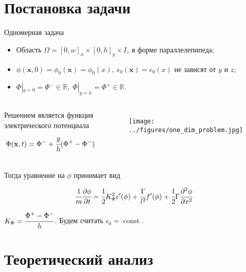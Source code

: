 \documentclass{beamer}
\DeclareMathOperator{\Const}{const}
\newcommand*{\hm}[1]{#1\nobreak\discretionary{}
{\hbox{$\mathsurround=0pt #1$}}{}}
\begin{document}
\section{Постановка задачи}

\begin{frame}{Одномерная задача}
\vspace{-0.2cm}
\begin{itemize}
	\item Область $\Omega = [0, w]_x \times [0, h]_y \times I_z$ в форме параллелепипеда;
	\item $\phi(\textbf{x}, 0) = \phi_0(\textbf{x}) = \phi_0(x), \; \epsilon_0(\textbf{x}) =
	\epsilon_0(x)$ не зависят от $y$ и $z$;
	\item $\Phi|_{y = 0} = \Phi^- \in \mathbb{R}, \; \Phi|_{y = h} = \Phi^+ \in \mathbb{R}$.
\end{itemize}
\vspace{-0.5cm}
\begin{columns}
Решением является функция электрического потенциала
\vspace{-0.2cm}
$$\Phi(\textbf{x}, t) = \Phi^- \hm + \cfrac{y}{h}(\Phi^+ - \Phi^-)$$
\begin{figure}
	\vspace*{-0.3cm}
	\hspace*{0.5cm}
	\texttt{[image: ../figures/one\_dim\_problem.jpg]}
\end{figure}
\end{columns}
\vspace{-0.4cm}
Тогда уравнение на $\phi$ принимает вид
\begin{block}{}
	$$\cfrac{1}{m} \cfrac{\partial \phi}{\partial t} = \cfrac{1}{2} K_\Phi^2 \epsilon'(\phi) +
	\cfrac{\Gamma}{l^2} f'(\phi) + \cfrac{1}{2} \Gamma \cfrac{\partial^2 \phi}{\partial x^2}$$
\end{block}
$K_\Phi = \cfrac{\Phi^+ - \Phi^-}{h}$. Будем считать $\epsilon_0 = \Const$.
\end{frame}


\section{Теоретический анализ}
\end{document}
